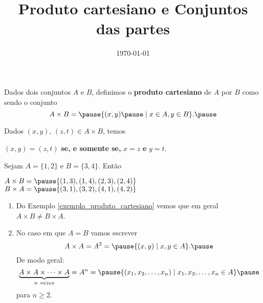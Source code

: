 \documentclass{beamer}
\title{Produto cartesiano e Conjuntos das partes}
\author[\autor]{\autor}
\institute[\instituto]{\instituto}
\date{\today}
\begin{document}
    \begin{frame}
        \maketitle
    \end{frame}


    \begin{frame}
        \begin{definicao}
        Dados dois conjuntos $A$ e $B$, \pause definimos o \textbf{produto cartesiano} \pause de $A$ por $B$ como sendo o conjunto\pause
        \[
            A \times B = \pause \{(x,y) \pause \mid x\in A, y\in B\}.\pause
        \]
        \end{definicao}

        Dados $(x,y)$, \pause $(z,t) \in A\times B$, \pause temos
        \begin{center}
            $(x,y) = (z,t)$ \pause \textbf{se, e somente se,} $x = z$ \pause \textbf{e} $y = t$.\pause
        \end{center}

        \begin{exemplo}\label{exemplo_produto_cartesiano}
            Sejam $A = \{1,2\}$ \pause e $B = \{3,4\}$. \pause Ent\~ao\pause
            \begin{center}
                $A \times B = \pause \{(1,3), (1,4), (2,3), (2,4)\}$\pause\\
                $B \times A = \pause \{(3,1), (3,2), (4,1), (4,2)\}$\pause
        \end{center}
        \end{exemplo}
    \end{frame}

    \begin{frame}
        \begin{observacoes}
            \begin{enumerate}[label={\arabic*})]
                \item Do Exemplo \eqref{exemplo_produto_cartesiano} \pause vemos que em geral $A \times B \neq B\times A$.\pause
                \item No caso em que $A = B$ \pause vamos escrever\pause
                \[
                    A \times A = A^2 = \pause \{ (x, y) \mid x, y \in A\}.\pause
                \]
                De modo geral:\pause
                \[
                    \underbrace{A \times A \times \cdots \times A}_{n\ vezes} = A^n = \pause \{ (x_1, x_2, \dots, x_n) \mid x_1, x_2, \dots, x_n \in A\}\pause
                \]
                para $n \ge 2$.
            \end{enumerate}
        \end{observacoes}
    \end{frame}
\end{document}
